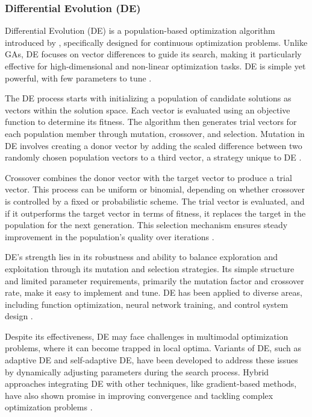 \subsubsection{Differential Evolution (DE)}

Differential Evolution (DE) is a population-based optimization algorithm introduced by \textcite{storn1997differential}, specifically designed for continuous optimization problems. Unlike GAs, DE focuses on vector differences to guide its search, making it particularly effective for high-dimensional and non-linear optimization tasks. DE is simple yet powerful, with few parameters to tune \parencite{price2006differential}.

The DE process starts with initializing a population of candidate solutions as vectors within the solution space. Each vector is evaluated using an objective function to determine its fitness. The algorithm then generates trial vectors for each population member through mutation, crossover, and selection. Mutation in DE involves creating a donor vector by adding the scaled difference between two randomly chosen population vectors to a third vector, a strategy unique to DE \parencite{mezura2006comparative}.

Crossover combines the donor vector with the target vector to produce a trial vector. This process can be uniform or binomial, depending on whether crossover is controlled by a fixed or probabilistic scheme. The trial vector is evaluated, and if it outperforms the target vector in terms of fitness, it replaces the target in the population for the next generation. This selection mechanism ensures steady improvement in the population's quality over iterations \parencite{das2010differential}.

DE's strength lies in its robustness and ability to balance exploration and exploitation through its mutation and selection strategies. Its simple structure and limited parameter requirements, primarily the mutation factor and crossover rate, make it easy to implement and tune. DE has been applied to diverse areas, including function optimization, neural network training, and control system design \parencite{miettinen1999nonlinear}.

Despite its effectiveness, DE may face challenges in multimodal optimization problems, where it can become trapped in local optima. Variants of DE, such as adaptive DE and self-adaptive DE, have been developed to address these issues by dynamically adjusting parameters during the search process. Hybrid approaches integrating DE with other techniques, like gradient-based methods, have also shown promise in improving convergence and tackling complex optimization problems \parencite{qin2008differential}.



